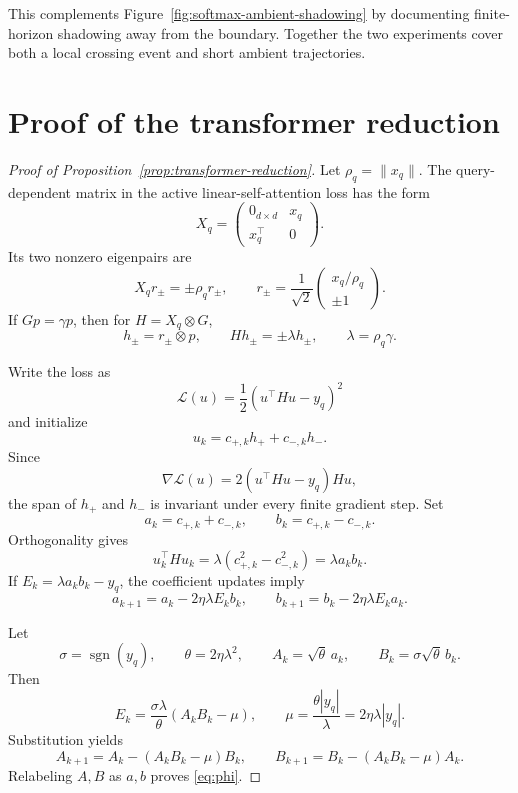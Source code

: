 \documentclass[11pt]{article}
\newcommand{\sgn}{\operatorname{sgn}}
\begin{document}
This complements Figure~\ref{fig:softmax-ambient-shadowing} by documenting
finite-horizon shadowing away from the boundary.  Together the two
experiments cover both a local crossing event and short ambient trajectories.

\section{Proof of the transformer reduction}
\label{app:transformer-proof}

\begin{proof}[Proof of Proposition~\ref{prop:transformer-reduction}]
Let \(\rho_q=\|x_q\|\).  The query-dependent matrix in the active
linear-self-attention loss has the form
\[
X_q=
\begin{pmatrix}
0_{d\times d}&x_q\\
x_q^\top&0
\end{pmatrix}.
\]
Its two nonzero eigenpairs are
\[
X_qr_\pm=\pm\rho_qr_\pm,
\qquad
r_\pm=\frac1{\sqrt2}
\begin{pmatrix}
x_q/\rho_q\\
\pm1
\end{pmatrix}.
\]
If \(Gp=\gamma p\), then for \(H=X_q\otimes G\),
\[
h_\pm=r_\pm\otimes p,
\qquad
Hh_\pm=\pm\lambda h_\pm,
\qquad
\lambda=\rho_q\gamma.
\]

Write the loss as
\[
\mathcal L(u)=\frac12(u^\top Hu-y_q)^2
\]
and initialize
\[
u_k=c_{+,k}h_++c_{-,k}h_-.
\]
Since
\[
\nabla\mathcal L(u)=2(u^\top Hu-y_q)Hu,
\]
the span of \(h_+\) and \(h_-\) is invariant under every finite gradient
step.  Set
\[
a_k=c_{+,k}+c_{-,k},
\qquad
b_k=c_{+,k}-c_{-,k}.
\]
Orthogonality gives
\[
u_k^\top Hu_k
=\lambda(c_{+,k}^2-c_{-,k}^2)
=\lambda a_kb_k.
\]
If \(E_k=\lambda a_kb_k-y_q\), the coefficient updates imply
\[
a_{k+1}=a_k-2\eta\lambda E_kb_k,
\qquad
b_{k+1}=b_k-2\eta\lambda E_ka_k.
\]

Let
\[
\sigma=\sgn(y_q),
\qquad
\theta=2\eta\lambda^2,
\qquad
A_k=\sqrt\theta\,a_k,
\qquad
B_k=\sigma\sqrt\theta\,b_k.
\]
Then
\[
E_k
=\frac{\sigma\lambda}{\theta}(A_kB_k-\mu),
\qquad
\mu=\frac{\theta|y_q|}{\lambda}
=2\eta\lambda|y_q|.
\]
Substitution yields
\[
A_{k+1}=A_k-(A_kB_k-\mu)B_k,
\qquad
B_{k+1}=B_k-(A_kB_k-\mu)A_k.
\]
Relabeling \(A,B\) as \(a,b\) proves \eqref{eq:phi}.
\end{proof}
\end{document}
